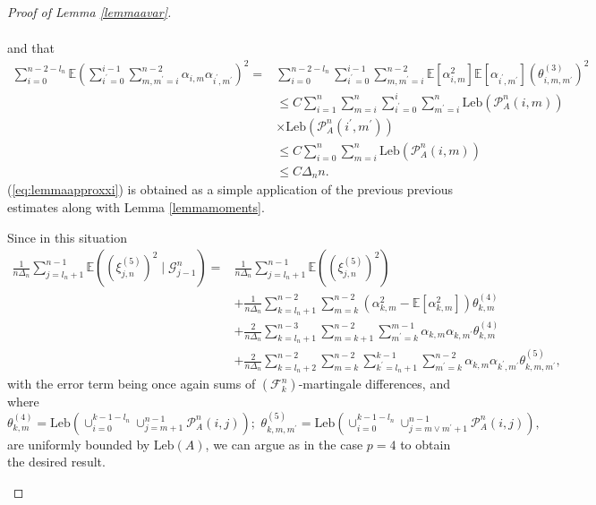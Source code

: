 \documentclass[10pt,a4paper]{amsart}
\newcommand{\Leb}{\ensuremath{\mathrm{Leb}}}
\begin{document}
\begin{proof}[Proof of Lemma \ref{lemmaavar}]
\begin{description}
\begin{align*}
		\end{align*}
		and that 
		\begin{equation}
			\begin{aligned}\sum_{i=0}^{n-2-l_{n}}\mathbb{E}\left(\sum_{i^{\prime}=0}^{i-1}\sum_{m,m^{\prime}=i}^{n-2}\alpha_{i,m}\alpha_{i^{\prime},m^{\prime}}\right)^{2}= & \sum_{i=0}^{n-2-l_{n}}\sum_{i^{\prime}=0}^{i-1}\sum_{m,m^{\prime}=i}^{n-2}\mathbb{E}[\alpha_{i,m}^{2}]\mathbb{E}[\alpha_{i^{\prime},m^{\prime}}](\theta_{i,m,m^{\prime}}^{(3)})^{2}\\
				& \leq C\sum_{i=1}^{n}\sum_{m=i}^{n}\sum_{i^{\prime}=0}^{i}\sum_{m^{\prime}=i}^{n}\Leb(\mathcal{P}_{A}^{n}(i,m))\\
				&\times\Leb(\mathcal{P}_{A}^{n}(i^{\prime},m^{\prime}))\\
				& \leq C\sum_{i=0}^{n}\sum_{m=i}^{n}\Leb(\mathcal{P}_{A}^{n}(i,m))\\
				& \leq C\Delta_{n}n.
			\end{aligned}
			\label{eq:bound2varp4}
		\end{equation}
		(\ref{eq:lemmaapproxxi}) is obtained as a simple application of the
		previous previous estimates along with Lemma  \ref{lemmamoments}.
		\item [{$p=5$:}] Since in this situation
		\begin{align*}
			\frac{1}{n\Delta_{n}}\sum_{j=l_{n}+1}^{n-1}\mathbb{E}((\xi_{j,n}^{(5)})^{2}\mid\mathscr{G}_{j-1}^{n})= & \frac{1}{n\Delta_{n}}\sum_{j=l_{n}+1}^{n-1}\mathbb{E}((\xi_{j,n}^{(5)})^{2})\\
			& +\frac{1}{n\Delta_{n}}\sum_{k=l_{n}+1}^{n-2}\sum_{m=k}^{n-2}\left(\alpha_{k,m}^{2}-\mathbb{E}[\alpha_{k,m}^{2}]\right)\theta_{k,m}^{(4)}\\
			& +\frac{2}{n\Delta_{n}}\sum_{k=l_{n}+1}^{n-3}\sum_{m=k+1}^{n-2}\sum_{m^{\prime}=k}^{m-1}\alpha_{k,m}\alpha_{k,m^{\prime}}\theta_{k,m}^{(4)}\\
			& +\frac{2}{n\Delta_{n}}\sum_{k=l_{n}+2}^{n-2}\sum_{m=k}^{n-2}\sum_{k^{\prime}=l_{n}+1}^{k-1}\sum_{m^{\prime}=k}^{n-2}\alpha_{k,m}\alpha_{k^{\prime},m^{\prime}}\theta_{k,m,m^{\prime}}^{(5)},
		\end{align*}
		with the error term being once again sums of $(\mathscr{F}_{k}^{n})$-martingale
		differences, and where 
		\begin{equation}
			\theta_{k,m}^{(4)}=\Leb(\cup_{i=0}^{k-1-l_{n}}\cup_{j=m+1}^{n-1}\mathcal{P}_{A}^{n}(i,j));\,\,\theta_{k,m,m^{\prime}}^{(5)}=\Leb(\cup_{i=0}^{k-1-l_{n}}\cup_{j=m\lor m^{\prime}+1}^{n-1}\mathcal{P}_{A}^{n}(i,j)),\label{eq:theta45def}
		\end{equation}
		are uniformly bounded by $\Leb(A)$, we can argue as in the case $p=4$ to obtain
		the desired result.
	\end{description}
	

\end{proof}
\end{document}
